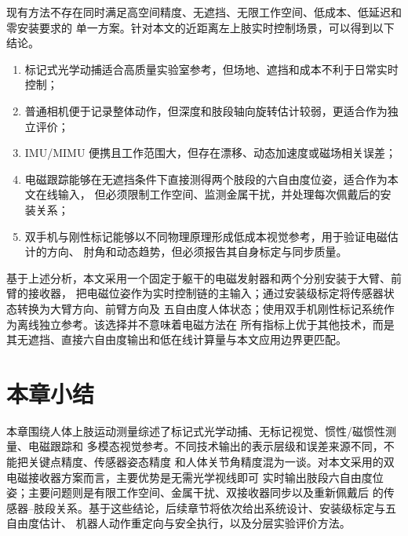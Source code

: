 现有方法不存在同时满足高空间精度、无遮挡、无限工作空间、低成本、低延迟和零安装要求的
单一方案。针对本文的近距离左上肢实时控制场景，可以得到以下结论。

\begin{enumerate}[label=\arabic*)]
  \item 标记式光学动捕适合高质量实验室参考，但场地、遮挡和成本不利于日常实时控制；
  \item 普通相机便于记录整体动作，但深度和肢段轴向旋转估计较弱，更适合作为独立评价；
  \item IMU/MIMU 便携且工作范围大，但存在漂移、动态加速度或磁场相关误差；
  \item 电磁跟踪能够在无遮挡条件下直接测得两个肢段的六自由度位姿，适合作为本文在线输入，
  但必须限制工作空间、监测金属干扰，并处理每次佩戴后的安装关系；
  \item 双手机与刚性标记能够以不同物理原理形成低成本视觉参考，用于验证电磁估计的方向、
  肘角和动态趋势，但必须报告其自身标定与同步质量。
\end{enumerate}

基于上述分析，本文采用一个固定于躯干的电磁发射器和两个分别安装于大臂、前臂的接收器，
把电磁位姿作为实时控制链的主输入；通过安装级标定将传感器状态转换为大臂方向、前臂方向及
五自由度人体状态；使用双手机刚性标记系统作为离线独立参考。该选择并不意味着电磁方法在
所有指标上优于其他技术，而是其无遮挡、直接六自由度输出和低在线计算量与本文应用边界更匹配。

\section{本章小结}
\label{sec:ch2_summary}

本章围绕人体上肢运动测量综述了标记式光学动捕、无标记视觉、惯性/磁惯性测量、电磁跟踪和
多模态视觉参考。不同技术输出的表示层级和误差来源不同，不能把关键点精度、传感器姿态精度
和人体关节角精度混为一谈。对本文采用的双电磁接收器方案而言，主要优势是无需光学视线即可
实时输出肢段六自由度位姿；主要问题则是有限工作空间、金属干扰、双接收器同步以及重新佩戴后
的传感器--肢段关系。基于这些结论，后续章节将依次给出系统设计、安装级标定与五自由度估计、
机器人动作重定向与安全执行，以及分层实验评价方法。

